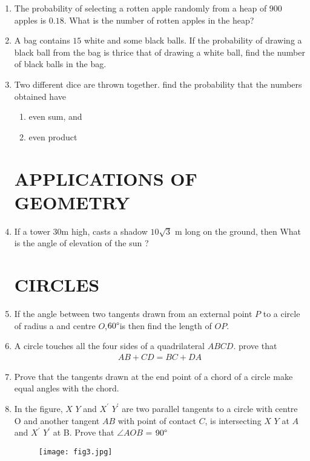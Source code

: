 \documentclass{article}
\begin{document}
\begin{enumerate}
\item The probability of selecting a rotten apple randomly from a heap of $900$ apples is $0.18$. What is the number of rotten apples in the heap?

\item A bag contains $15$ white and some black balls. If the probability of drawing a black ball from the bag is thrice that of drawing a white ball, find the number of black balls in the bag.

\item Two  different dice are thrown together. find the probability that the numbers obtained have

\begin{enumerate}
    \item even sum, and
    \item even product
\end{enumerate}


\section{APPLICATIONS OF GEOMETRY}

\item If a tower $30$m high, casts a shadow $10\sqrt{3}$ m long on the ground, then What is the angle of elevation of the sun ?

\section{CIRCLES}

\item If the angle between two tangents drawn from an external point $P$ to a circle of radius a and centre $O$,$60\degree$is then find the length of $O$$P$.

\item A circle touches all the four sides of a quadrilateral $A$$B$$C$$D$. prove that
\begin{align*}
     AB+CD = BC+DA
\end{align*}

\item Prove that the tangents drawn at the end point of a chord of a circle make equal angles with the chord.

\item In the figure, $X$ $Y$ and $X^\prime $ $Y^\prime $ are two parallel tangents to a circle with centre O and another tangent $A$$B$ with point of contact $C$, is intersecting $X$ $Y$ at $A$ and $X^\prime $ $Y^\prime $ at B. Prove that $\angle AOB$ = $90\degree$
\begin{figure}[H]
    \centering
    \texttt{[image: fig3.jpg]}
\end{figure}


\end{enumerate}
\end{document}
